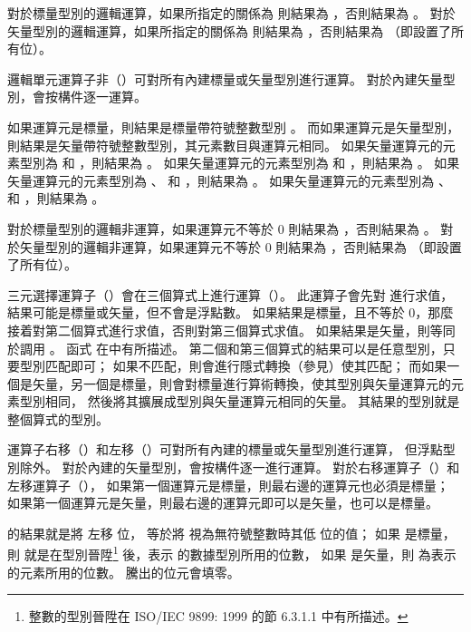 {對於標量型別的邏輯運算，如果所指定的關係為  則結果為 ，否則結果為 。
對於矢量型別的邏輯運算，如果所指定的關係為  則結果為 ，否則結果為  （即設置了所有位）。
\stopitem

\startitem
邏輯單元運算子非（\ccmm{!}）可對所有內建標量或矢量型別進行運算。
對於內建矢量型別，會按構件逐一運算。

如果運算元是標量，則結果是標量帶符號整數型別 。
而如果運算元是矢量型別，則結果是矢量帶符號整數型別，其元素數目與運算元相同。
如果矢量運算元的元素型別為  和 ，則結果為 。
如果矢量運算元的元素型別為  和 ，則結果為 。
如果矢量運算元的元素型別為 、  和 ，則結果為 。
如果矢量運算元的元素型別為 、  和 ，則結果為 。

對於標量型別的邏輯非運算，如果運算元不等於 0 則結果為 ，否則結果為 。
對於矢量型別的邏輯非運算，如果運算元不等於 0 則結果為 ，否則結果為  （即設置了所有位）。
\stopitem

\startitem
三元選擇運算子（）會在三個算式上進行運算（）。
此運算子會先對  進行求值，結果可能是標量或矢量，但不會是浮點數。
如果結果是標量，且不等於 0，那麼接着對第二個算式進行求值，否則對第三個算式求值。
如果結果是矢量，則等同於調用 。
函式  在中有所描述。
第二個和第三個算式的結果可以是任意型別，只要型別匹配即可；
如果不匹配，則會進行隱式轉換（參見）使其匹配；
而如果一個是矢量，另一個是標量，則會對標量進行算術轉換，使其型別與矢量運算元的元素型別相同，
然後將其擴展成型別與矢量運算元相同的矢量。
其結果的型別就是整個算式的型別。
\stopitem

\startitem
運算子右移（\ccmm{>>}）和左移（\ccmm{<<}）可對所有內建的標量或矢量型別進行運算，
但浮點型別除外。
對於內建的矢量型別，會按構件逐一進行運算。
對於右移運算子（\ccmm{>>}）和左移運算子（\ccmm{<<}），
如果第一個運算元是標量，則最右邊的運算元也必須是標量；
如果第一個運算元是矢量，則最右邊的運算元即可以是矢量，也可以是標量。

 的結果就是將  左移  位，
  等於將  視為無符號整數時其低  位的值；
如果  是標量，則  就是在型別晉陞\footnote{
整數的型別晉陞在 ISO/IEC 9899: 1999 的節 6.3.1.1 中有所描述。}
後，表示  的數據型別所用的位數，
如果  是矢量，則  為表示  的元素所用的位數。
騰出的位元會填零。

}
